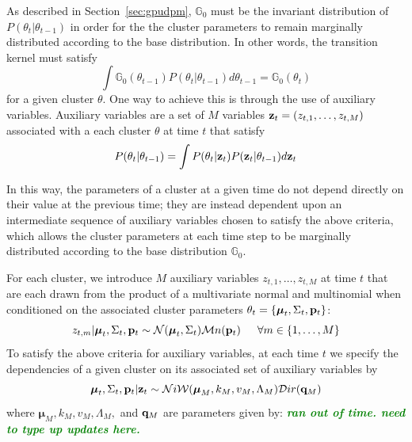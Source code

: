 \documentclass[smallcondensed, final]{svjour3}
\newcommand{\willie}[1]{\textcolor{green}{\textsf{\emph{\textbf{\textcolor{green}{#1}}}}}}
\begin{document}
As described in Section~\ref{sec:gpudpm}, $\mathbb{G}_{0}$ must be the invariant distribution of $P(\theta_{t} | \theta_{t-1})$ in order for the the cluster parameters to remain marginally distributed according to the base distribution. In other words, the transition kernel must satisfy
\begin{equation}
\int \mathbb{G}_{0}(\theta_{t-1})P(\theta_{t} | \theta_{t-1}) d\theta_{t-1} = \mathbb{G}_{0}(\theta_{t})
\end{equation}
for a given cluster $\theta$. One way to achieve this is through the use of auxiliary variables. Auxiliary variables are a set of $M$ variables $\bold{z}_{t} = (z_{t,1}, \ldots, z_{t,M})$ associated with a each cluster $\theta$ at time $t$ that satisfy
\begin{eqnarray}
P(\theta_{t} | \theta_{t-1}) = \int P(\theta_{t} | \bold{z}_{t}) P(\bold{z}_{t} | \theta_{t-1}) d \bold{z}_{t}  %
\end{eqnarray}

In this way, the parameters of a cluster at a given time do not depend directly on their value at the previous time; they are instead dependent upon an intermediate sequence of auxiliary variables chosen to satisfy the above criteria, which allows the cluster parameters at each time step to be marginally distributed according to the base distribution $\mathbb{G}_{0}$.

For each cluster, we introduce $M$ auxiliary variables $z_{t, 1}, \ldots, z_{t, M}$ at time $t$ that are each drawn from the product of a multivariate normal and multinomial when conditioned on the associated cluster parameters $\theta_{t} = \{ \boldsymbol{\mu}_{t}, \Sigma_{t}, \bold{p}_{t} \}$:
\begin{equation} \label{transker1}
z_{t, m} | \boldsymbol{\mu}_{t}, \Sigma_{t}, \bold{p}_{t}  \sim  \mathcal{N}(\boldsymbol{\mu}_{t}, \Sigma_{t}) \mathcal{M}n(\bold{p}_{t})   \hspace{15pt}   
\forall m \in \{ 1, \ldots, M \}
\end{equation}
To satisfy the above criteria for auxiliary variables, at each time $t$ we specify the dependencies of a given cluster on its associated set of auxiliary variables by
\begin{equation} \label{transker2}
\boldsymbol{\mu}_{t}, \Sigma_{t}, \bold{p}_{t} | \bold{z}_t  \sim  \mathcal{N}i\mathcal{W}(\boldsymbol{\mu}_{M}, k_{M}, v_{M}, \Lambda_{M})  \mathcal{D}ir(\bold{q}_{M})
\end{equation}
where $\boldsymbol{\mu}_{M}, k_{M}, v_{M}, \Lambda_{M},$ and $\bold{q}_{M}$ are parameters given by:
\willie{ran out of time. need to type up updates here.}
\end{document}
